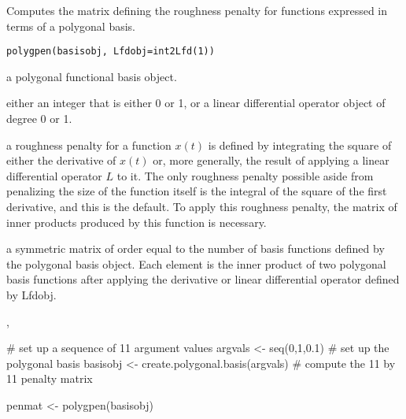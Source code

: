 \documentclass{article}
\begin{document}
\begin{Description}\relax
Computes the matrix defining the roughness penalty for functions
expressed in terms of a polygonal basis.
\end{Description}
\begin{Usage}
\begin{verbatim}
polygpen(basisobj, Lfdobj=int2Lfd(1))
\end{verbatim}
\end{Usage}
\begin{Arguments}
\begin{ldescription}
\item[\code{basisobj}] a polygonal functional basis object.

\item[\code{Lfdobj}] either an integer that is either 0 or 1, or a
linear differential operator object of degree 0 or 1.

\end{ldescription}
\end{Arguments}
\begin{Details}\relax
a roughness penalty for a function $ x(t) $ is defined by
integrating the square of either the derivative of  $ x(t) $ or,
more generally, the result of applying a linear differential operator
$ L $ to it.  The only roughness penalty possible aside from
penalizing the size of the function itself is the integral
of the square of the first derivative, and
this is the default. To apply this roughness penalty, the matrix of
inner products produced by this function is necessary.
\end{Details}
\begin{Value}
a symmetric matrix of order equal to the number of basis functions
defined by the polygonal basis object.  Each element is the inner product
of two polygonal basis functions after applying the derivative or linear
differential operator defined by Lfdobj.
\end{Value}
\begin{SeeAlso}\relax
{},
\end{SeeAlso}
\begin{Examples}
\begin{ExampleCode}

#  set up a sequence of 11 argument values
argvals <- seq(0,1,0.1)
#  set up the polygonal basis
basisobj <- create.polygonal.basis(argvals)
#  compute the 11 by 11 penalty matrix

penmat <- polygpen(basisobj)

\end{ExampleCode}
\end{Examples}
\end{document}
